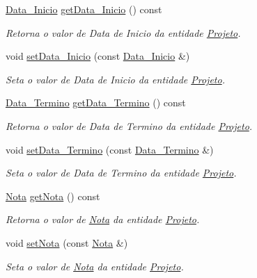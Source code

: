 \begin{DoxyCompactItemize}
\hyperlink{class_data___inicio}{\-Data\-\_\-\-Inicio} \hyperlink{class_projeto_a309461d7f136b25d6624b054c7beb3f0}{get\-Data\-\_\-\-Inicio} () const 
\begin{DoxyCompactList}\small\item\em \-Retorna o valor de \-Data de \-Inicio da entidade \hyperlink{class_projeto}{\-Projeto}. \end{DoxyCompactList}\item 
void \hyperlink{class_projeto_a699ba726969093cf54a3b1a7677c4434}{set\-Data\-\_\-\-Inicio} (const \hyperlink{class_data___inicio}{\-Data\-\_\-\-Inicio} \&)
\begin{DoxyCompactList}\small\item\em \-Seta o valor de \-Data de \-Inicio da entidade \hyperlink{class_projeto}{\-Projeto}. \end{DoxyCompactList}\item 
\hyperlink{class_data___termino}{\-Data\-\_\-\-Termino} \hyperlink{class_projeto_ae29e37b6730fc277a460d864238df94b}{get\-Data\-\_\-\-Termino} () const 
\begin{DoxyCompactList}\small\item\em \-Retorna o valor de \-Data de \-Termino da entidade \hyperlink{class_projeto}{\-Projeto}. \end{DoxyCompactList}\item 
void \hyperlink{class_projeto_a5371af0d47b30cb46fcd02a4d5fde73f}{set\-Data\-\_\-\-Termino} (const \hyperlink{class_data___termino}{\-Data\-\_\-\-Termino} \&)
\begin{DoxyCompactList}\small\item\em \-Seta o valor de \-Data de \-Termino da entidade \hyperlink{class_projeto}{\-Projeto}. \end{DoxyCompactList}\item 
\hyperlink{class_nota}{\-Nota} \hyperlink{class_projeto_add8f77d42d9c5656456b7625f00c2c02}{get\-Nota} () const 
\begin{DoxyCompactList}\small\item\em \-Retorna o valor de \hyperlink{class_nota}{\-Nota} da entidade \hyperlink{class_projeto}{\-Projeto}. \end{DoxyCompactList}\item 
void \hyperlink{class_projeto_ad074101c3df39dea6c3569c75593f338}{set\-Nota} (const \hyperlink{class_nota}{\-Nota} \&)
\begin{DoxyCompactList}\small\item\em \-Seta o valor de \hyperlink{class_nota}{\-Nota} da entidade \hyperlink{class_projeto}{\-Projeto}. \end{DoxyCompactList}\end{DoxyCompactItemize}


